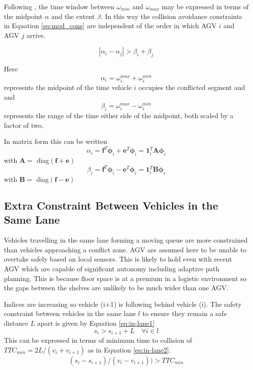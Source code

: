 Following \cite{Digani2019}, the time window between $\omega_{min}$ and $\omega_{max}$ may be expressed in terms of the midpoint $\alpha$ and the extent $\beta$. In this way the collision avoidance constraints in Equation \ref{eq:mod_cons} are independent of the order in which AGV $i$ and AGV $j$ arrive.

\begin{equation}
	\label{eq:mod_cons}
	|\alpha_i - \alpha_j|> \beta_i + \beta_j
\end{equation}

Here
\begin{equation}
	\alpha_i = \omega_i^{max} + \omega_i^{min}
\end{equation}
represents the midpoint of the time vehicle $i$ occupies the conflicted segment and and
\begin{equation}
	\beta_i = \omega_i^{max} - \omega_i^{min}
\end{equation}
represents the range of the time either side of the midpoint, both scaled by a factor of two.

In matrix form this can be written
\begin{equation}
	\label{eq:alpha_mat}
	\alpha_i = \bm{f}^T\bm{\phi}_i + \bm{e}^T\bm{\phi}_i = \bm{1}_i^T\bm{A}\bm{\phi}_i
\end{equation}
with $\bm{A}= $ diag$(\bm{f} + \bm{e})$
\begin{equation}
	\label{eq:beta_mat}
	\beta_i = \bm{f}^T\bm{\phi}_i - \bm{e}^T\bm{\phi}_i = \bm{1}_i^T\bm{B}\bm{\phi}_i
\end{equation}
with $\bm{B}= $ diag$(\bm{f} - \bm{e})$

\subsection{Extra Constraint Between Vehicles in the Same Lane}
Vehicles travelling in the same lane forming a moving queue are more constrained than vehicles approaching a conflict zone. AGV are assumed here to be unable to overtake safely based on local sensors. This is likely to hold even with recent AGV which are capable of significant autonomy including adaptive path planning. This is because floor space is at a premium in a logistic environment so the gaps between the shelves are unlikely to be much wider than one AGV.

Indices are increasing so vehicle (i+1) is following behind vehicle (i). The safety constraint between vehicles in the same lane $l$ to ensure they remain a safe distance $L$ apart is given by Equation \ref{eq:in-lane1}
\begin{equation}
	s_{i} > s_{i+1} + L \quad \forall i \in l
	\label{eq:in-lane1}
\end{equation}
This can be expressed in terms of minimum time to collision of $TTC_{min} = 2 L/(v_i + v_{i+1})$ as in Equation \ref{eq:in-lane2}.
\begin{equation}
	(s_{i}-s_{i+1})/(v_i - v_{i+1})) > TTC_{min}
	\label{eq:in-lane2}
\end{equation}

